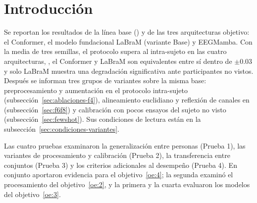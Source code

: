 \section{Introducción}
\label{cap:resultados}

Se reportan los resultados de la línea base (\eegnet{}) y de las tres arquitecturas
objetivo: el Conformer, el modelo fundacional LaBraM (variante Base) y EEGMamba. Con la media
de tres semillas, el protocolo \loso{} supera al intra-sujeto en las cuatro arquitecturas,
\eegnet{}, el Conformer y LaBraM son equivalentes entre sí dentro de $\pm 0.03$ y solo LaBraM
muestra una degradación significativa ante participantes no vistos. Después se informan tres
grupos de variantes sobre la misma base: preprocesamiento y aumentación en el protocolo
intra-sujeto (subsección~\ref{sec:ablaciones-f4}), alineamiento euclidiano y reflexión de canales
en \loso{} (subsección~\ref{sec:f6f8}) y calibración con pocos ensayos del sujeto no visto
(subsección~\ref{sec:fewshot}). Sus condiciones de lectura están en la
subsección~\ref{sec:condiciones-variantes}.



Las cuatro pruebas examinaron la generalización entre personas (Prueba 1), las variantes de procesamiento y calibración (Prueba 2), la transferencia entre conjuntos (Prueba 3) y los criterios adicionales al desempeño (Prueba 4). En conjunto aportaron evidencia para el objetivo~\ref{oe:4}; la segunda examinó el procesamiento del objetivo~\ref{oe:2}, y la primera y la cuarta evaluaron los modelos del objetivo~\ref{oe:3}.
